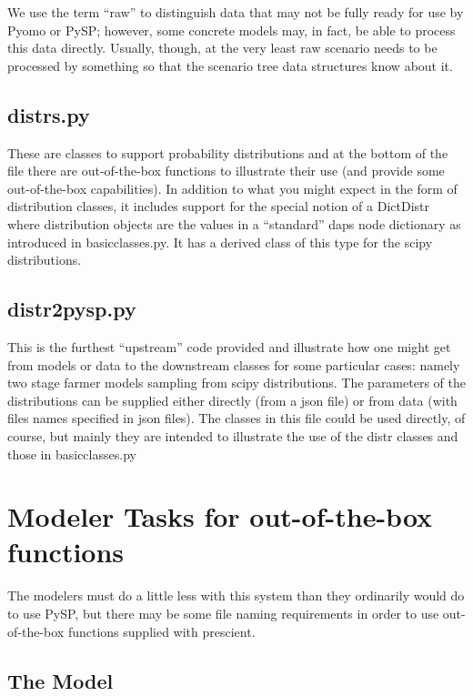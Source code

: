 \documentclass[12pt]{article}
\begin{document}
We use the term ``raw'' to distinguish data that may not be fully
ready for use by Pyomo or PySP; however, some concrete models may, in
fact, be able to process this data directly. Usually, though, at the
very least raw scenario needs to be processed by something so that the
scenario tree data structures know about it.

\subsection{distrs.py}

These are classes to support probability distributions and at the bottom of the file there
are out-of-the-box functions to illustrate their use (and provide some out-of-the-box
capabilities). In addition to what you might expect in the form of distribution
classes, it includes support for the special notion of a DictDistr where distribution
objects are the values in a ``standard'' daps node dictionary as introduced in basicclasses.py.
It has a derived class of this type for the scipy distributions.

\subsection{distr2pysp.py}

This is the furthest ``upstream'' code provided and illustrate how one might get from models or data
to the downstream classes for some particular cases: namely two stage farmer models sampling from
scipy distributions. The parameters of the distributions can be supplied either directly (from
a json file) or from data (with files names specified in json files). The classes in this file
could be used directly, of course, but mainly they are intended to illustrate the use of the
distr classes and those in basicclasses.py

\newpage
\section{Modeler Tasks for out-of-the-box functions}

The modelers must do a little less with this system than they ordinarily would
do to use PySP, but there may be some file naming requirements in order to use
out-of-the-box functions supplied with prescient.

\subsection{The Model}
\end{document}
